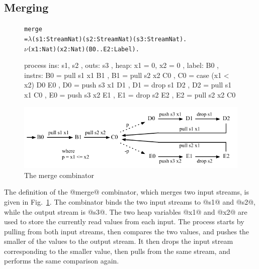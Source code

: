 \subsection{Merging}
\begin{figure}
\begin{alltt}
               merge
                 = \(\lambda\) (s1: Stream Nat) (s2: Stream Nat) (s3: Stream Nat). 
                   \(\nu\) (x1: Nat) (x2: Nat) (B0..E2: Label).
\end{alltt}
\begin{code}
                   process
                   { ins:    { s1, s2 }
                   , outs:   { s3 }
                   , heap:   { x1 = 0, x2 = 0 }
                   , label:  B0
                   , instrs: { B0 = pull s1 x1     B1 {}
                             , B1 = pull s2 x2     C0 {}
                             , C0 = case (x1 < x2) D0 {}  E0 {}
                             , D0 = push s3 x1     D1 {}
                             , D1 = drop s1        D2 {}
                             , D2 = pull s1 x1     C0 {}
                             , E0 = push s3 x2     E1 {}
                             , E1 = drop s2        E2 {}
                             , E2 = pull s2 x2     C0 {} } }
\end{code}

\medskip
\includegraphics[scale=1.1]{figures/state-merge.pdf}
\caption{The merge combinator}
\label{fig:Process:Merge}
\end{figure}

The definition of the @merge@ combinator, which merges two input streams, is given in Fig.~\ref{fig:Process:Merge}.
The combinator binds the two input streams to @s1@ and @s2@, while the output stream is @s3@.
The two heap variables @x1@ and @x2@ are used to store the currently read values from each input.
The process starts by pulling from both input streams, then compares the two values, and pushes the smaller of the values to the output stream.
It then drops the input stream corresponding to the smaller value, then pulls from the same stream, and performs the same comparison again.

